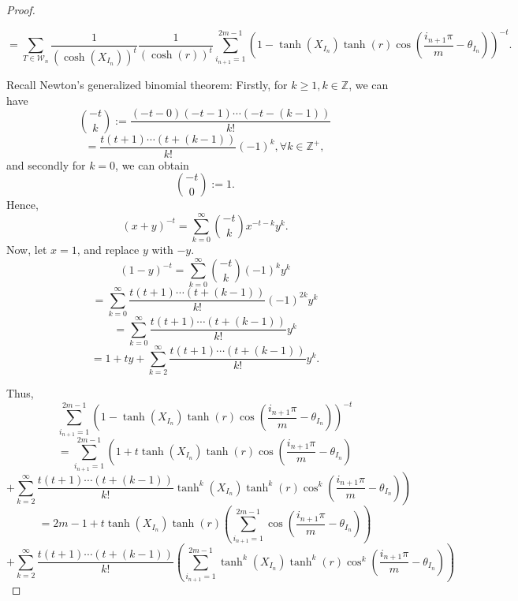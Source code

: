 \documentclass[12pt,oneside]{sfsuthesis}
\theoremstyle{plain} %
\theoremstyle{definition}  %
\theoremstyle{remark}  %
\theoremstyle{plain}
\begin{document}
{\begin{proof}
\begin{small}
$$=\sum_{T\in\mathcal{W}_n}\frac{1}{\left(\cosh\left(X_{I_{n}}\right)\right)^t}\frac{1}{\left(\cosh\left(r\right)\right)^t}\sum_{i_{n+1}=1}^{2m-1}\left(1-\tanh\left(X_{I_n}\right)\tanh\left(r\right)\cos\left(\frac{i_{n+1}\pi}{m}-\theta_{I_{n}}\right)\right)^{-t}.
$$
\end{small}
Recall Newton's generalized binomial theorem: Firstly, for $k\geq 1,k\in\mathbb{Z}$, we can have
$$
\binom{-t}{k}:=\frac{\left(-t-0\right)\left(-t-1\right)\cdots \left(-t-\left(k-1\right)\right)}{k!}
$$
$$
=\frac{t\left(t+1\right)\cdots\left(t+\left(k-1\right)\right)}{k!}\left(-1\right)^k, \forall k \in\mathbb{Z}^{+},
$$
and secondly for $k=0$, we can obtain
$$
\binom{-t}{0}:=1.
$$
Hence, 
$$
\left(x+y \right)^{-t}=\sum_{k=0}^\infty \binom{-t}{k} x^{-t-k}y^k.
$$
Now, let $x=1$, and replace $y$ with $-y$.
$$
\left(1-y \right)^{-t}=\sum_{k=0}^\infty \binom{-t}{k} \left(-1\right)^k y^k
$$
$$
=\sum_{k=0}^\infty \frac{t\left(t+1\right)\cdots\left(t+\left(k-1\right)\right)}{k!} \left(-1\right)^{2k} y^k
$$
$$ = \sum_{k=0}^\infty \frac{t\left(t+1\right)\cdots\left(t+\left(k-1\right)\right)}{k!}   y^k
$$
$$
=1+ty+\sum_{k=2}^\infty \frac{t\left(t+1\right)\cdots\left(t+\left(k-1\right)\right)}{k!} y^k.
$$

Thus, 
$$
\sum_{i_{n+1}=1}^{2m-1}\left(1-\tanh\left(X_{I_n}\right)\tanh\left(r\right)\cos\left(\frac{i_{n+1}\pi}{m}-\theta_{I_{n}}\right)\right)^{-t}
$$
$$
=\sum_{i_{n+1}=1}^{2m-1}\left( 1+t\tanh\left( X_{I_n}\right)\tanh\left(r \right)\cos \left(\frac{i_{n+1} \pi}{m}-\theta_{I_n} \right)\right.
$$
$$
\left.
+\sum_{k=2}^{\infty}\frac{t\left(t+1\right)\cdots\left(t+\left(k-1\right)\right)}{k!}\tanh^k\left(X_{I_n}\right)\tanh^k\left(r\right)\cos^k\left(\frac{i_{n+1}\pi}{m}-\theta_{I_{n}}\right)
\right)
$$
$$
=2m-1+t\tanh\left(X_{I_n} \right)\tanh\left(r\right)\left(\sum_{i_{n+1}=1}^{2m-1}\cos\left(\frac{i_{n+1}\pi}{m}-\theta_{I_n}\right) \right)
$$
$$
+\sum_{k=2}^{\infty}\frac{t\left(t+1\right)\cdots\left(t+\left(k-1\right)\right)}{k!}
\left(\sum_{i_{n+1}=1}^{2m-1} 
\tanh^k\left(X_{I_n}\right)\tanh^k\left(r\right)\cos^k\left(\frac{i_{n+1}\pi}{m}-\theta_{I_{n}}\right)
\right)
$$


\end{proof}}
\end{document}
